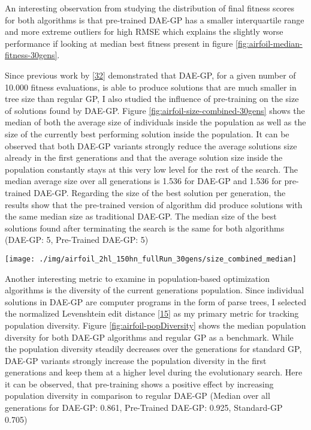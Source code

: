 \documentclass[
  11pt,
]{article}
\let\origfigure\figure
\let\endorigfigure\endfigure
\renewenvironment{figure}[1][2] {
    \expandafter\origfigure\expandafter[H]
} {
    \endorigfigure
}
\begin{document}
An interesting observation from studying the distribution of final fitness scores for both algorithms is that pre-trained DAE-GP has a smaller interquartile range and more extreme outliers for high RMSE which explains the slightly worse performance if looking at median best fitness present in figure \ref{fig:airfoil-median-fitness-30gens}.

Since previous work by {[}\protect\hyperlink{ref-dae-gp_2022_symreg}{32}{]} demonstrated that DAE-GP, for a given number of 10.000 fitness evaluations, is able to produce solutions that are much smaller in tree size than regular GP, I also studied the influence of pre-training on the size of solutions found by DAE-GP. Figure \ref{fig:airfoil-size-combined-30gens} shows the median of both the average size of individuals inside the population as well as the size of the currently best performing solution inside the population. It can be observed that both DAE-GP variants strongly reduce the average solutions size already in the first generations and that the average solution size inside the population constantly stays at this very low level for the rest of the search. The median average size over all generations is 1.536 for DAE-GP and 1.536 for pre-trained DAE-GP. Regarding the size of the best solution per generation, the results show that the pre-trained version of algorithm did produce solutions with the same median size as traditional DAE-GP. The median size of the best solutions found after terminating the search is the same for both algorithms (DAE-GP: 5, Pre-Trained DAE-GP: 5)

\begin{figure}[c]

{\centering \texttt{[image: ./img/airfoil\_2hl\_150hn\_fullRun\_30gens/size\_combined\_median]} 

}

\caption{Median Solution Size over 30 Generations - Airfoil}\label{fig:airfoil-size-combined-30gens}
\end{figure}

Another interesting metric to examine in population-based optimization algorithms is the diversity of the current generations population. Since individual solutions in DAE-GP are computer programs in the form of parse trees, I selected the normalized Levenshtein edit distance {[}\protect\hyperlink{ref-NormLevDistance}{15}{]} as my primary metric for tracking population diversity. Figure \ref{fig:airfoil-popDiversity} shows the median population diversity for both DAE-GP algorithms and regular GP as a benchmark. While the population diversity steadily decreases over the generations for standard GP, DAE-GP variants strongly increase the population diversity in the first generations and keep them at a higher level during the evolutionary search. Here it can be observed, that pre-training shows a positive effect by increasing population diversity in comparison to regular DAE-GP (Median over all generations for DAE-GP: 0.861, Pre-Trained DAE-GP: 0.925, Standard-GP 0.705)
\end{document}
